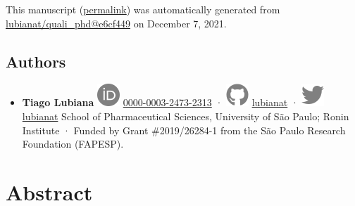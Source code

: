 This manuscript
(\href{https://lubianat.github.io/quali_phd/v/e6cf449283aa647015cb56637d7c2de7d9f53a02/}{permalink})
was automatically generated
from \href{https://github.com/lubianat/quali_phd/tree/e6cf449283aa647015cb56637d7c2de7d9f53a02}{lubianat/quali\_phd@e6cf449}
on December 7, 2021.

\hypertarget{authors}{%
\subsection{Authors}\label{authors}}

\begin{itemize}
\tightlist
\item
  \textbf{Tiago Lubiana}
  \includegraphics{images/orcid.svg}
  \href{https://orcid.org/0000-0003-2473-2313}{0000-0003-2473-2313}
  · \includegraphics{images/github.svg}
  \href{https://github.com/lubianat}{lubianat}
  · \includegraphics{images/twitter.svg}
  \href{https://twitter.com/lubianat}{lubianat}
  School of Pharmaceutical Sciences, University of São Paulo; Ronin Institute
  · Funded by Grant \#2019/26284-1 from the São Paulo Research Foundation (FAPESP).
\end{itemize}

\hypertarget{abstract}{%
\section{Abstract}\label{abstract}}

